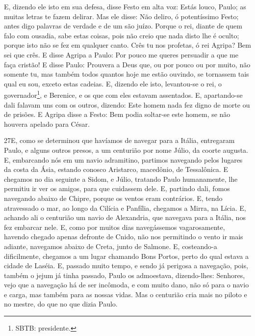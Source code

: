 E, dizendo ele isto em sua defesa, disse Festo em alta voz: Estás
louco, Paulo; as muitas letras te fazem delirar. Mas ele
disse: Não deliro, ó potentíssimo Festo; antes digo palavras de
verdade e de um são juízo. Porque o rei, diante de quem falo
com ousadia, sabe estas coisas, pois não creio que nada disto lhe é
oculto; porque isto não se fez em qualquer canto. Crês tu nos
profetas, ó rei Agripa? Bem sei que crês. E disse Agripa a
Paulo: Por pouco me queres persuadir a que me faça cristão! E
disse Paulo: Prouvera a Deus que, ou por pouco ou por muito, não
somente tu, mas também todos quantos hoje me estão ouvindo, se
tornassem tais qual eu sou, exceto estas cadeias. E, dizendo
ele isto, levantou-se o rei, o governador\footnote{SBTB:
presidente.}, e Berenice, e os que com eles estavam assentados.
E, apartando-se dali falavam uns com os outros, dizendo: Este
homem nada fez digno de morte ou de prisões. E Agripa disse a
Festo: Bem podia soltar-se este homem, se não houvera apelado para
César.

\medskip

\lettrine{27} E, como se determinou que havíamos de navegar
para a Itália, entregaram Paulo, e alguns outros presos, a um
centurião por nome Júlio, da coorte augusta. E, embarcando nós
em um navio adramitino, partimos navegando pelos lugares da costa da
Ásia, estando conosco Aristarco, macedônio, de Tessalônica. E
chegamos no dia seguinte a Sidom, e Júlio, tratando Paulo
humanamente, lhe permitiu ir ver os amigos, para que cuidassem dele.
E, partindo dali, fomos navegando abaixo de Chipre, porque os
ventos eram contrários. E, tendo atravessado o mar, ao longo da
Cilícia e Panfília, chegamos a Mirra, na Lícia. E, achando ali o
centurião um navio de Alexandria, que navegava para a Itália, nos
fez embarcar nele. E, como por muitos dias navegássemos
vagarosamente, havendo chegado apenas defronte de Cnido, não nos
permitindo o vento ir mais adiante, navegamos abaixo de Creta, junto
de Salmone. E, costeando-a dificilmente, chegamos a um lugar
chamando Bons Portos, perto do qual estava a cidade de Laséia.
E, passado muito tempo, e sendo já perigosa a navegação, pois,
também o jejum já tinha passado, Paulo os admoestava,
dizendo-lhes: Senhores, vejo que a navegação há de ser
incômoda, e com muito dano, não só para o navio e carga, mas também
para as nossas vidas. Mas o centurião cria mais no piloto e
no mestre, do que no que dizia Paulo.

